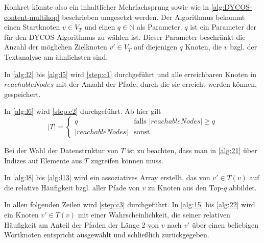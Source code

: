 Konkret könnte also ein inhaltlicher Mehrfachsprung sowie wie in
\cref{alg:DYCOS-content-multihop} beschrieben umgesetzt werden.
Der Algorithmus bekommt einen Startknoten $v \in V_T$ und
einen $q \in \mathbb{N}$ als Parameter. $q$ ist ein Parameter der
für den DYCOS-Algorithmus zu wählen ist. Dieser Parameter beschränkt 
die Anzahl der möglichen Zielknoten $v' \in V_T$ auf diejenigen
$q$ Knoten, die $v$ bzgl. der Textanalyse am ähnlichsten sind.

In \cref{alg:l2} bis \cref{alg:l5} wird \cref{step:c1} durchgeführt
und alle erreichbaren Knoten in $reachableNodes$ mit der Anzahl
der Pfade, durch die sie erreicht werden können, gespeichert.

In \cref{alg:l6} wird \cref{step:c2} durchgeführt. 
Ab hier gilt
\[ |T| = \begin{cases}q               &\text{falls } |reachableNodes|\geq q\\
                     |reachableNodes| &\text{sonst }\end{cases}\]

Bei der Wahl der Datenstruktur von $T$ ist zu beachten, dass man in
\cref{alg:21} über Indizes auf Elemente aus $T$ zugreifen können muss.

In \cref{alg:l8} bis \ref{alg:l13} wird ein assoziatives Array erstellt,
das von $v' \in T(v)$ auf die relative
Häufigkeit bzgl. aller Pfade von $v$ zu Knoten aus den Top-$q$ abbildet.

In allen folgenden Zeilen wird \cref{step:c3} durchgeführt. 
In \cref{alg:15} bis \cref{alg:22} wird ein Knoten $v' \in T(v)$ mit
einer Wahrscheinlichkeit, die seiner relativen Häufigkeit am Anteil
der Pfaden der Länge 2 von $v$ nach $v'$ über einen beliebigen 
Wortknoten entspricht ausgewählt und schließlich zurückgegeben.

